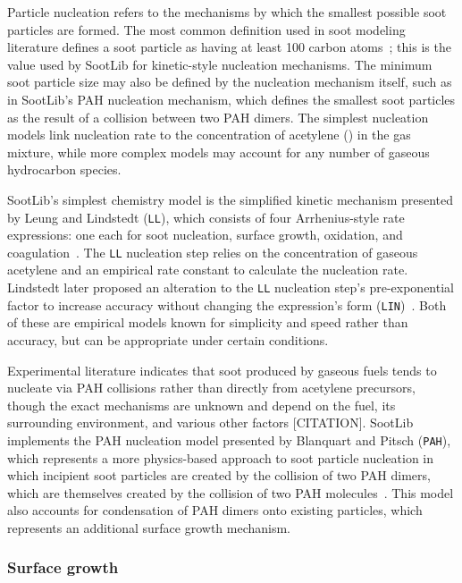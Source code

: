 \documentclass[preprint,letterpaper]{elsarticle}
\begin{document}
Particle nucleation refers to the mechanisms by which the smallest possible soot particles are formed. The most common definition used in soot modeling literature defines a soot particle as having at least 100 carbon atoms~\cite{Leung_1991}; this is the value used by SootLib for kinetic-style nucleation mechanisms. The minimum soot particle size may also be defined by the nucleation mechanism itself, such as in SootLib's PAH nucleation mechanism, which defines the smallest soot particles as the result of a collision between two PAH dimers. The simplest nucleation models link nucleation rate to the concentration of acetylene () in the gas mixture, while more complex models may account for any number of gaseous hydrocarbon species.

SootLib's simplest chemistry model is the simplified kinetic mechanism presented by Leung and Lindstedt (\texttt{LL}), which consists of four Arrhenius-style rate expressions: one each for soot nucleation, surface growth, oxidation, and coagulation~\cite{Leung_1991}. The \texttt{LL} nucleation step relies on the concentration of gaseous acetylene and an empirical rate constant to calculate the nucleation rate. Lindstedt later proposed an alteration to the \texttt{LL} nucleation step's pre-exponential factor to increase accuracy without changing the expression's form (\texttt{LIN})~\cite{Lindstedt_2005}. Both of these are empirical models known for simplicity and speed rather than accuracy, but can be appropriate under certain conditions.

Experimental literature indicates that soot produced by gaseous fuels tends to nucleate via PAH collisions rather than directly from acetylene precursors, though the exact mechanisms are unknown and depend on the fuel, its surrounding environment, and various other factors [CITATION]. SootLib implements the PAH nucleation model presented by Blanquart and Pitsch (\texttt{PAH}), which represents a more physics-based approach to soot particle nucleation in which incipient soot particles are created by the collision of two PAH dimers, which are themselves created by the collision of two PAH molecules~\cite{Blanquart_2009c}. This model also accounts for condensation of PAH dimers onto existing particles, which represents an additional surface growth mechanism.

\subsubsection{Surface growth}
\label{sss:grw}
\end{document}
